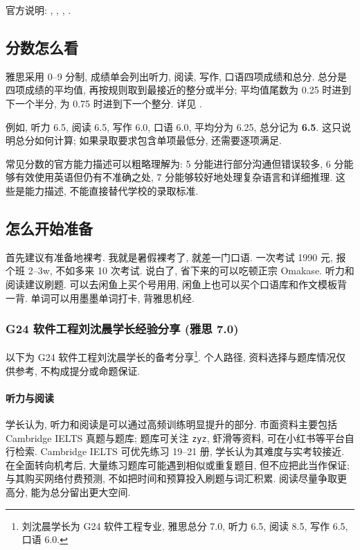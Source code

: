 \documentclass{jit-qut}
\begin{document}
官方说明: , , , .

\subsection{分数怎么看}

雅思采用 0--9 分制, 成绩单会列出听力, 阅读, 写作, 口语四项成绩和总分. 总分是四项成绩的平均值, 再按规则取到最接近的整分或半分; 平均值尾数为 0.25 时进到下一个半分, 为 0.75 时进到下一个整分. 详见 .

例如, 听力 6.5, 阅读 6.5, 写作 6.0, 口语 6.0, 平均分为 6.25, 总分记为 \textbf{6.5}. 这只说明总分如何计算; 如果录取要求包含单项最低分, 还需要逐项满足.

常见分数的官方能力描述可以粗略理解为: 5 分能进行部分沟通但错误较多, 6 分能够有效使用英语但仍有不准确之处, 7 分能够较好地处理复杂语言和详细推理. 这些是能力描述, 不能直接替代学校的录取标准.

\subsection{怎么开始准备}
首先建议有准备地裸考. 我就是暑假裸考了, 就差一门口语. 一次考试 1990 元, 报个班 2--3w, 不如多来 10 次考试. 说白了, 省下来的可以吃顿正宗 Omakase.
听力和阅读建议刷题. 可以去闲鱼上买个号用用, 闲鱼上也可以买个口语库和作文模板背一背. 单词可以用墨墨单词打卡, 背雅思机经. 

\subsubsection{G24 软件工程刘沈晨学长经验分享 (雅思 7.0)}

以下为 G24 软件工程刘沈晨学长的备考分享\footnote{刘沈晨学长为 G24 软件工程专业, 雅思总分 7.0, 听力 6.5, 阅读 8.5, 写作 6.5, 口语 6.0.}. 个人路径, 资料选择与题库情况仅供参考, 不构成提分或命题保证.

\paragraph{听力与阅读} 学长认为, 听力和阅读是可以通过高频训练明显提升的部分. 市面资料主要包括 Cambridge IELTS 真题与题库; 题库可关注 \texttt{zyz}, 虾滑等资料, 可在小红书等平台自行检索. Cambridge IELTS 可优先练习 19--21 册, 学长认为其难度与实考较接近. 在全面转向机考后, 大量练习题库可能遇到相似或重复题目, 但不应把此当作保证; 与其购买网络付费预测, 不如把时间和预算投入刷题与词汇积累. 阅读尽量争取更高分, 能为总分留出更大空间.
\end{document}
